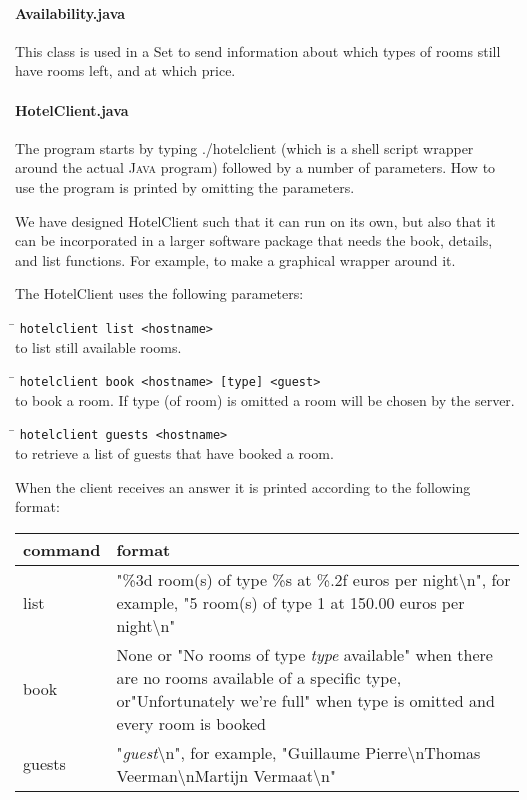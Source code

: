 \documentclass[a4paper,10pt]{article}
\begin{document}
\paragraph{Availability.java}
This class is used in a Set to send information about which types of rooms still have rooms left, and at which price.

\paragraph{HotelClient.java}
The program starts by typing ./hotelclient (which is a shell script wrapper around the actual \textsc{Java} program) followed by a number of parameters. How to use the program is printed by omitting the parameters.

We have designed HotelClient such that it can run on its own, but also that it can be incorporated in a larger software package that needs the book, details, and list functions. For example, to make a graphical wrapper around it.

The HotelClient uses the following parameters:

\begin{tabbing}
\hspace{20pt}\=\kill
 \> \texttt{hotelclient list <hostname>} \\
 \> to list still available rooms.
\end{tabbing}

\begin{tabbing}
\hspace{20pt}\=\kill
 \> \texttt{hotelclient book <hostname> [type] <guest>} \\
 \> to book a room. If type (of room) is omitted a room will be chosen by the server.
\end{tabbing}

\begin{tabbing}
\hspace{20pt}\=\kill
 \> \texttt{hotelclient guests <hostname>} \\
 \> to retrieve a list of guests that have booked a room.
\end{tabbing}

When the client receives an answer it is printed according to the following format:

\begin{center}
\begin{tabular}{ l | p{9.3cm} }
\textbf{command} & \textbf{format}\\ \hline
list & "\%3d room(s) of type \%s at \%.2f euros per night\textbackslash n", for example, "5 room(s) of type 1 at 150.00 euros per night\textbackslash n"\\ \hline
book & None or "No rooms of type \emph{type} available" when there are no rooms available of a specific type, or"Unfortunately we're full" when type is omitted and every room is booked \\ \hline
guests & "\emph{guest}\textbackslash n", for example, "Guillaume Pierre\textbackslash nThomas Veerman\textbackslash nMartijn Vermaat\textbackslash n" \\
\end{tabular}
\end{center}
\end{document}
